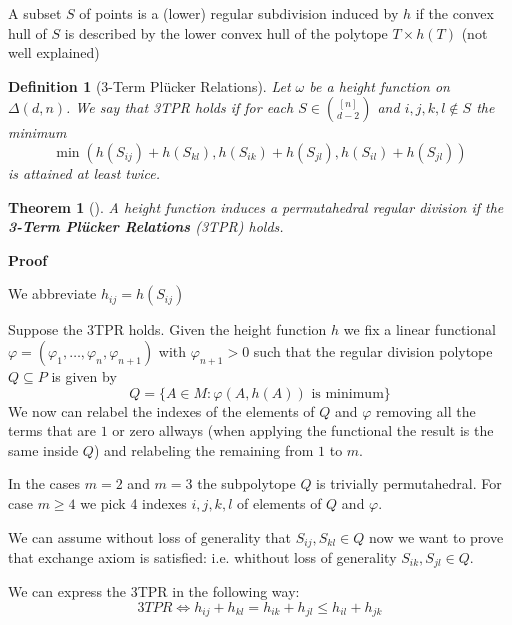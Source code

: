 \documentclass{myclass}
\newtheorem*{definition}{Definition}
\newtheorem*{theorem}{Theorem}
\begin{document}
A subset $S$ of points is a (lower) regular subdivision induced by $h$ if the convex hull of $S$ is described by the lower convex hull of the polytope $T\times h(T)$ (not well explained)

\begin{definition}[3-Term Plücker Relations] Let $\omega $ be a height function on $\Delta(d, n)$.
We say that 3TPR holds if for each $S\in \binom{[n]}{ d-2}$ and $i, j, k, l \not\in S$ the minimum
\[
\min (h(S_{ij}) + h(S_{kl}), h(S_{ik}) + h(S_{jl}), h(S_{il}) +  h(S_{jl}))
\] 
is attained at least twice.
\end{definition}

\begin{theorem}[] A height function induces a permutahedral regular division if the \textbf{3-Term Plücker Relations} (3TPR) holds.
\end{theorem}


\textbf{Proof}

We abbreviate $h_{ij} = h(S_{ij})$

Suppose the 3TPR holds. Given the height function $h$ we fix a linear functional $\varphi = (\varphi _1, \ldots, \varphi _n, \varphi _{n+1})$ with $\varphi _{n+1}>0$ such that the regular division polytope $Q\subseteq P$ is given by
\[
Q = \{A\in M : \varphi (A, h(A)) \text{ is minimum}\}
\] 
We now can relabel the indexes of the elements of $Q$ and $\varphi $ removing all the terms that are $1$ or zero allways (when applying the functional the result is the same inside $Q$) and relabeling the remaining from $1$ to  $m$.

In the cases $m = 2$ and  $m=3$ the subpolytope $Q$ is trivially permutahedral. For case $m\ge 4$ we pick 4 indexes $i, j, k, l$ of elements of $Q$ and $\varphi $. 

We can assume without loss of generality that $S_{ij}, S_{kl} \in Q$ now we want to prove that exchange axiom is satisfied: i.e. whithout loss of generality $S_{ik}, S_{jl}\in Q$.

We can express the 3TPR in the following way:
\[
  3TPR \iff h_{ij} + h_{kl} = h_{ik} + h_{jl}\le h_{il} + h_{jk}
\] 
\end{document}
